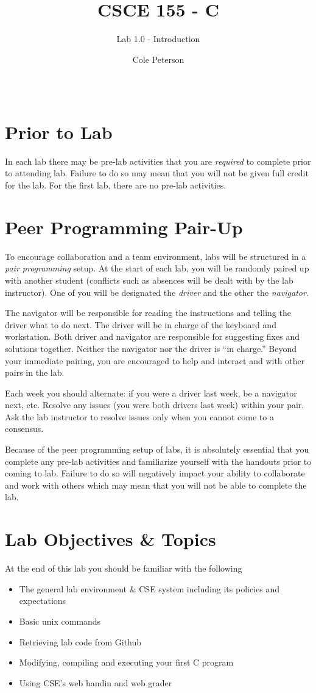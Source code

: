 \documentclass[12pt]{scrartcl}
\title{CSCE 155 - C}
\subtitle{Lab 1.0 - Introduction}
\author{Cole Peterson}
\date{~}
\begin{document}
\maketitle

\section*{Prior to Lab}

In each lab there may be pre-lab activities that you are \emph{required} to
complete prior to attending lab.  Failure to do so may mean that you will
not be given full credit for the lab.  For the first lab, there are no pre-lab
activities.

\section*{Peer Programming Pair-Up}

To encourage collaboration and a team environment, labs will be
structured in a \emph{pair programming} setup.  At the start of
each lab, you will be randomly paired up with another student 
(conflicts such as absences will be dealt with by the lab instructor).
One of you will be designated the \emph{driver} and the other
the \emph{navigator}.  

The navigator will be responsible for reading the instructions and
telling the driver what to do next.  The driver will be in charge of the
keyboard and workstation.  Both driver and navigator are responsible
for suggesting fixes and solutions together.  Neither the navigator
nor the driver is ``in charge.''  Beyond your immediate pairing, you
are encouraged to help and interact and with other pairs in the lab.

Each week you should alternate: if you were a driver last week, 
be a navigator next, etc.  Resolve any issues (you were both drivers
last week) within your pair.  Ask the lab instructor to resolve issues
only when you cannot come to a consensus.  

Because of the peer programming setup of labs, it is absolutely 
essential that you complete any pre-lab activities and familiarize
yourself with the handouts prior to coming to lab.  Failure to do
so will negatively impact your ability to collaborate and work with 
others which may mean that you will not be able to complete the
lab.  

\section{Lab Objectives \& Topics}
At the end of this lab you should be familiar with the following
\begin{itemize}
  \item The general lab environment \& CSE system including its policies and expectations
  \item Basic unix commands
  \item Retrieving lab code from Github
  \item Modifying, compiling and executing your first C program
  \item Using CSE's web handin and web grader
\end{itemize}
\end{document}
